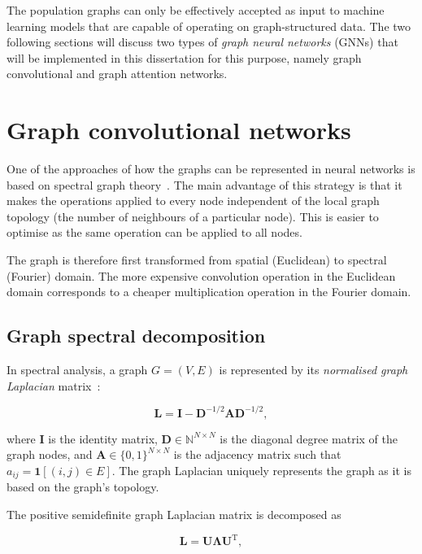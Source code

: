 The population graphs can only be effectively accepted as input to machine learning models that are capable of operating on graph-structured data. The two following sections will discuss two types of \textit{graph neural networks} (GNNs) that will be implemented in this dissertation for this purpose, namely graph convolutional and graph attention networks.

\section{Graph convolutional networks}
\label{training-gcn}

One of the approaches of how the graphs can be represented in neural networks is based on spectral graph theory~\cite{hammond2011wavelets}. The main advantage of this strategy is that it makes the operations applied to every node independent of the local graph topology (the number of neighbours of a particular node). This is easier to optimise as the same operation can be applied to all nodes. 

The graph is therefore first transformed from spatial (Euclidean) to spectral (Fourier) domain. The more expensive convolution operation in the Euclidean domain corresponds to a cheaper multiplication operation in the Fourier domain.

\subsection{Graph spectral decomposition}

In spectral analysis, a graph $G = (V, E)$ is represented by its \textit{normalised graph Laplacian} matrix~\cite{defferrard2016convolutional}: 

\begin{equation}
    \mathbf{L} = \mathbf{I} - \mathbf{D}^{-1/2}\mathbf{A}\mathbf{D}^{-1/2},
\end{equation}

where $\mathbf{I}$ is the identity matrix, $\mathbf{D} \in \mathbb{N}^{N \times N}$ is the diagonal degree matrix of the graph nodes, and $\mathbf{A} \in \{0, 1\}^{N \times N}$ is the adjacency matrix such that $a_{ij} = \mathbf{1}[(i, j) \in E]$. The graph Laplacian uniquely represents the graph as it is based on the graph's topology.

The positive semidefinite graph Laplacian matrix is decomposed as

\begin{equation}
    \mathbf{L} = \mathbf{U\Lambda U}^\mathrm{T},
\end{equation}

